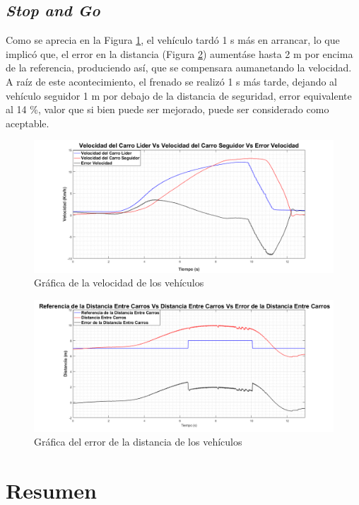 \subsection{\textit{Stop and Go}}
Como se aprecia en la Figura \ref{fig:velstgcs}, el vehículo tardó 1 s más en arrancar, lo que implicó que, el error en la distancia (Figura \ref{fig:diststgcs}) aumentáse hasta 2 m por encima de la referencia, produciendo así, que se compensara aumanetando la velocidad. A raíz de este acontecimiento, el frenado se realizó 1 s más tarde, dejando al vehículo seguidor 1 m por debajo de la distancia de seguridad, error equivalente al 14 \%, valor que si bien puede ser mejorado, puede ser considerado como aceptable.\\   
\begin{figure}[H]
	\centering
		\includegraphics[scale=0.35]{Imagenes/velstgcs}
		\caption{Gráfica de la velocidad de los vehículos}
		\label{fig:velstgcs}
\end{figure}	

\begin{figure}[H]
	\centering
		\includegraphics[scale=0.35]{Imagenes/diststgcs}
		\caption{Gráfica del error de la distancia de los vehículos}
		\label{fig:diststgcs}
\end{figure}	



\section{Resumen}

